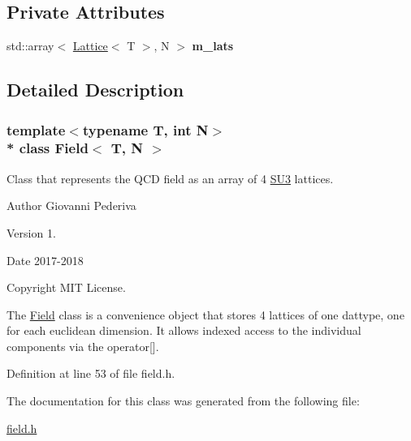 \subsection*{Private Attributes}
\begin{DoxyCompactItemize}
\item 
std\+::array$<$ \hyperlink{classLattice}{Lattice}$<$ T $>$, N $>$ {\bfseries m\+\_\+lats}\hypertarget{classField_a77cf6ee4ca0b27bb2a92572a4d705044}{}\label{classField_a77cf6ee4ca0b27bb2a92572a4d705044}

\end{DoxyCompactItemize}


\subsection{Detailed Description}
\subsubsection*{template$<$typename T, int N$>$\\*
class Field$<$ T, N $>$}

Class that represents the Q\+CD field as an array of 4 \hyperlink{structSU3}{S\+U3} lattices. 

\begin{DoxyAuthor}{Author}
Giovanni Pederiva 
\end{DoxyAuthor}
\begin{DoxyVersion}{Version}
1. 
\end{DoxyVersion}
\begin{DoxyDate}{Date}
2017-\/2018 
\end{DoxyDate}
\begin{DoxyCopyright}{Copyright}
M\+IT License.
\end{DoxyCopyright}
The \hyperlink{classField}{Field} class is a convenience object that stores 4 lattices of one dattype, one for each euclidean dimension. It allows indexed access to the individual components via the operator\mbox{[}\mbox{]}. 

Definition at line 53 of file field.\+h.



The documentation for this class was generated from the following file\+:\begin{DoxyCompactItemize}
\item 
\hyperlink{field_8h}{field.\+h}\end{DoxyCompactItemize}
